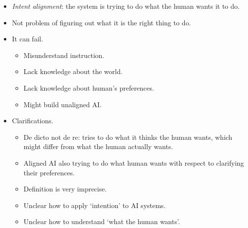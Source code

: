 \begin{itemize}
    \item \emph{Intent alignment}: the system is trying to do what the human wants it to do.
    \item Not problem of figuring out what it is the right thing to do.
    \item It can fail.
    \begin{itemize}
        \item Misunderstand instruction.
        \item Lack knowledge about the world.
        \item Lack knowledge about human's preferences.
        \item Might build unaligned AI.
    \end{itemize}
    \item Clarifications.
    \begin{itemize}
        \item De dicto not de re: tries to do what it thinks the human wants, which might differ from what the human actually wants.
        \item Aligned AI also trying to do what human wants with respect to clarifying their preferences.
        \item Definition is very imprecise.
        \item Unclear how to apply `intention' to AI systems.
        \item Unclear how to understand `what the human wants'.
    \end{itemize}
\end{itemize}